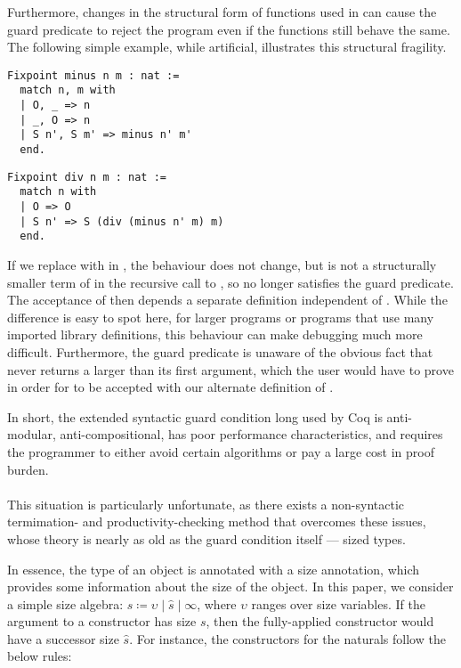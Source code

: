 Furthermore, changes in the structural form of functions used in \cofixpoints can cause the guard predicate to reject the program even if the functions still behave the same.
The following simple example, while artificial, illustrates this structural fragility.
\begin{verbatim}
Fixpoint minus n m : nat :=
  match n, m with
  | O, _ => n
  | _, O => n
  | S n', S m' => minus n' m'
  end.
\end{verbatim}
\begin{verbatim}
Fixpoint div n m : nat :=
  match n with
  | O => O
  | S n' => S (div (minus n' m) m)
  end.
\end{verbatim}

If we replace  with  in , the behaviour does not change, but  is not a structurally smaller term of  in the recursive call to , so  no longer satisfies the guard predicate.
The acceptance of  then depends a separate definition independent of .
While the difference is easy to spot here, for larger programs or programs that use many imported library definitions,
this behaviour can make debugging much more difficult.
Furthermore, the guard predicate is unaware of the obvious fact that  never returns a  larger than its first argument, which the user would have to prove in order for  to be accepted with our alternate definition of .

In short, the extended syntactic guard condition long used by Coq is anti-modular, anti-compositional, has poor performance characteristics, and requires the programmer to either avoid certain algorithms or pay a large cost in proof burden.

\paragraph*{} This situation is particularly unfortunate, as there exists a non-syntactic termimation- and productivity-checking method that overcomes these issues,
whose theory is nearly as old as the guard condition itself --- sized types.

In essence, the \coinductive type of an object is annotated with a size annotation, which provides some information about the size of the object.
In this paper, we consider a simple size algebra: \mbox{$s \coloneqq \upsilon \mid \hat{s} \mid \infty$}, where $\upsilon$ ranges over size variables.
If the argument to a constructor has size $s$, then the fully-applied constructor would have a successor size $\hat{s}$.
For instance, the constructors for the naturals follow the below rules:

